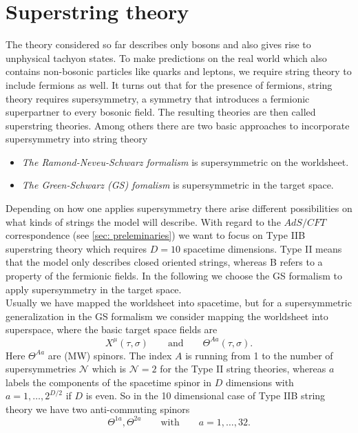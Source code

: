 \section{Superstring theory}
The theory considered so far describes only bosons and also gives rise to unphysical tachyon states. To make predictions on the real world which also contains non-bosonic particles like quarks and leptons, we require string theory to include fermions as well. It turns out that for the presence of fermions, string theory requires supersymmetry, a symmetry that introduces a fermionic superpartner to every bosonic field. The resulting theories are then called superstring theories. Among others there are two basic approaches to incorporate supersymmetry into string theory \cite{Becker:2007zj}
%
%
\begin{itemize}
\item \textit{The Ramond-Neveu-Schwarz formalism} is supersymmetric on the worldsheet.
%
\item \textit{The Green-Schwarz (GS) fomalism} is supersymmetric in the target space.
\end{itemize}
%
%
Depending on how one applies supersymmetry there arise different possibilities on what kinds of strings the model will describe. With regard to the $AdS/CFT$ correspondence (see \autoref{sec: preleminaries}) we want to focus on Type IIB superstring theory which requires $D=10$ spacetime dimensions. Type II means that the model only describes closed oriented strings, whereas B refers to a property of the fermionic fields. In the following we choose the GS formalism to apply supersymmetry in the target space. \\
Usually we have mapped the worldsheet into spacetime, but for a supersymmetric generalization in the GS formalism we consider mapping the worldsheet into superspace, where the basic target space fields are
%
%
\begin{equation}
X^{\mu}(\tau,\sigma) \qquad \text{and} \qquad \mathit{\Theta}^{Aa}(\tau,\sigma).
\end{equation}
%
%
Here $\mathit{\Theta}^{Aa}$ are  (MW) spinors. The index $A$ is running from 1 to the number of supersymmetries $\mathcal{N}$ which is $\mathcal{N}=2$ for the Type II string theories, whereas $a$ labels the components of the spacetime spinor in $D$ dimensions with $a=1,\ldots,2^{D/2}$ if $D$ is even. So in the 10 dimensional case of Type IIB string theory we have two anti-commuting spinors
%
%
\begin{equation}
\mathit{\Theta}^{1a}, \mathit{\Theta}^{2a}\qquad \text{with} \qquad a=1,\ldots,32.
\end{equation}
